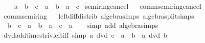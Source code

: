 \begin{isabellebody}
\ \ \ \ {\isachardoublequoteopen}a\ {\isacharasterisk}{\kern0pt}\ {\isacharparenleft}{\kern0pt}b\ {\isacharminus}{\kern0pt}\ c{\isacharparenright}{\kern0pt}\ {\isacharequal}{\kern0pt}\ a\ {\isacharasterisk}{\kern0pt}\ b\ {\isacharminus}{\kern0pt}\ a\ {\isacharasterisk}{\kern0pt}\ c{\isachardoublequoteclose}\isanewline
{}\isanewline
\isanewline
{}\isamarkupfalse%
\ semiring{\isacharunderscore}{\kern0pt}{}{\isacharunderscore}{\kern0pt}cancel%
\isadelimproof
\ %
\endisadelimproof
%
\isatagproof
\isacommand{{\isachardot}{\kern0pt}{\isachardot}{\kern0pt}}\isamarkupfalse%
%
\endisatagproof
{\isafoldproof}%
%
\isadelimproof
%
\endisadelimproof
\isanewline
{}\isamarkupfalse%
\ comm{\isacharunderscore}{\kern0pt}semiring{\isacharunderscore}{\kern0pt}{}{\isacharunderscore}{\kern0pt}cancel%
\isadelimproof
\ %
\endisadelimproof
%
\isatagproof
\isacommand{{\isachardot}{\kern0pt}{\isachardot}{\kern0pt}}\isamarkupfalse%
%
\endisatagproof
{\isafoldproof}%
%
\isadelimproof
%
\endisadelimproof
\isanewline
{}\isamarkupfalse%
\ comm{\isacharunderscore}{\kern0pt}semiring{\isacharunderscore}{\kern0pt}{}%
\isadelimproof
\ %
\endisadelimproof
%
\isatagproof
\isacommand{{\isachardot}{\kern0pt}{\isachardot}{\kern0pt}}\isamarkupfalse%
%
\endisatagproof
{\isafoldproof}%
%
\isadelimproof
%
\endisadelimproof
\isanewline
\isanewline
{}\isamarkupfalse%
\ left{\isacharunderscore}{\kern0pt}diff{\isacharunderscore}{\kern0pt}distrib{\isacharprime}{\kern0pt}\ {\isacharbrackleft}{\kern0pt}algebra{\isacharunderscore}{\kern0pt}simps{\isacharcomma}{\kern0pt}\ algebra{\isacharunderscore}{\kern0pt}split{\isacharunderscore}{\kern0pt}simps{\isacharbrackright}{\kern0pt}{\isacharcolon}{\kern0pt}\isanewline
\ \ {\isachardoublequoteopen}{\isacharparenleft}{\kern0pt}b\ {\isacharminus}{\kern0pt}\ c{\isacharparenright}{\kern0pt}\ {\isacharasterisk}{\kern0pt}\ a\ {\isacharequal}{\kern0pt}\ b\ {\isacharasterisk}{\kern0pt}\ a\ {\isacharminus}{\kern0pt}\ c\ {\isacharasterisk}{\kern0pt}\ a{\isachardoublequoteclose}\isanewline
%
\isadelimproof
\ \ %
\endisadelimproof
%
\isatagproof
{}\isamarkupfalse%
\ {\isacharparenleft}{\kern0pt}simp\ add{\isacharcolon}{\kern0pt}\ algebra{\isacharunderscore}{\kern0pt}simps{\isacharparenright}{\kern0pt}%
\endisatagproof
{\isafoldproof}%
%
\isadelimproof
\isanewline
%
\endisadelimproof
\isanewline
{}\isamarkupfalse%
\ dvd{\isacharunderscore}{\kern0pt}add{\isacharunderscore}{\kern0pt}times{\isacharunderscore}{\kern0pt}triv{\isacharunderscore}{\kern0pt}left{\isacharunderscore}{\kern0pt}iff\ {\isacharbrackleft}{\kern0pt}simp{\isacharbrackright}{\kern0pt}{\isacharcolon}{\kern0pt}\ {\isachardoublequoteopen}a\ dvd\ c\ {\isacharasterisk}{\kern0pt}\ a\ {\isacharplus}{\kern0pt}\ b\ {\isasymlongleftrightarrow}\ a\ dvd\ b{\isachardoublequoteclose}\isanewline

\end{isabellebody}
